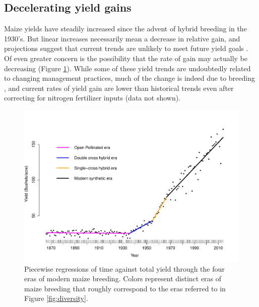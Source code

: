 \documentclass[final,12pt]{article}
\begin{document}
\subsection*{Decelerating yield gains} 

Maize yields have steadily increased since the advent of hybrid breeding in the 1930's.
But linear increases necessarily mean a decrease in relative gain, and projections suggest that current trends are unlikely to meet future yield goals \citep{grassini2013distinguishing}. 
Of even greater concern is the possibility that the rate of gain may actually be decreasing (Figure \ref{fig:piecewise}).
While some of these yield trends are undoubtedly related to changing management practices, much of the change is indeed due to breeding \citep{Duvick:2001fy}, and current rates of yield gain are lower than historical trends even after correcting for nitrogen fertilizer inputs (data not shown). 

\begin{figure}
\includegraphics[width=0.6\linewidth]{yield.pdf}
\caption{Piecewise regressions of time against total yield through the four eras of modern maize breeding. Colors represent distinct eras of maize breeding that roughly correspond to the eras  referred to in Figure \ref{fig:diversity}.} 
\label{fig:piecewise}
\end{figure}
 
%
\end{document}
